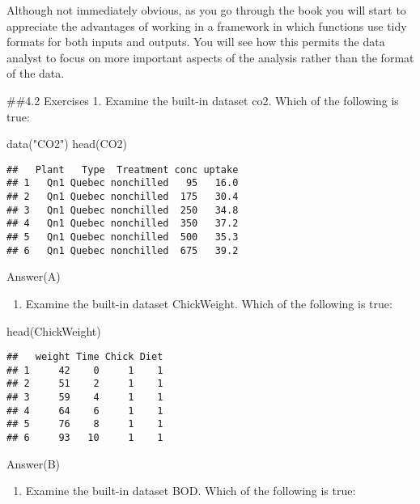 \documentclass[
]{article}
\newenvironment{Shaded}{\begin{snugshade}}{\end{snugshade}}
\newcommand{\FunctionTok}[1]{\textcolor[rgb]{0.00,0.00,0.00}{#1}}
\newcommand{\NormalTok}[1]{#1}
\newcommand{\StringTok}[1]{\textcolor[rgb]{0.31,0.60,0.02}{#1}}
\providecommand{\tightlist}{%
  \setlength{\itemsep}{0pt}\setlength{\parskip}{0pt}}
\begin{document}
Although not immediately obvious, as you go through the book you will
start to appreciate the advantages of working in a framework in which
functions use tidy formats for both inputs and outputs. You will see how
this permits the data analyst to focus on more important aspects of the
analysis rather than the format of the data.

\#\#4.2 Exercises 1. Examine the built-in dataset co2. Which of the
following is true:

\begin{Shaded}
\begin{Highlighting}[]
\FunctionTok{data}\NormalTok{(}\StringTok{"CO2"}\NormalTok{)}
\FunctionTok{head}\NormalTok{(CO2)}
\end{Highlighting}
\end{Shaded}

\begin{verbatim}
##   Plant   Type  Treatment conc uptake
## 1   Qn1 Quebec nonchilled   95   16.0
## 2   Qn1 Quebec nonchilled  175   30.4
## 3   Qn1 Quebec nonchilled  250   34.8
## 4   Qn1 Quebec nonchilled  350   37.2
## 5   Qn1 Quebec nonchilled  500   35.3
## 6   Qn1 Quebec nonchilled  675   39.2
\end{verbatim}

Answer(A)

\begin{enumerate}
\def\labelenumi{\arabic{enumi}.}
\setcounter{enumi}{1}
\tightlist
\item
  Examine the built-in dataset ChickWeight. Which of the following is
  true:
\end{enumerate}

\begin{Shaded}
\begin{Highlighting}[]
\FunctionTok{head}\NormalTok{(ChickWeight)}
\end{Highlighting}
\end{Shaded}

\begin{verbatim}
##   weight Time Chick Diet
## 1     42    0     1    1
## 2     51    2     1    1
## 3     59    4     1    1
## 4     64    6     1    1
## 5     76    8     1    1
## 6     93   10     1    1
\end{verbatim}

Answer(B)

\begin{enumerate}
\def\labelenumi{\arabic{enumi}.}
\setcounter{enumi}{2}
\tightlist
\item
  Examine the built-in dataset BOD. Which of the following is true:
\end{enumerate}
\end{document}
